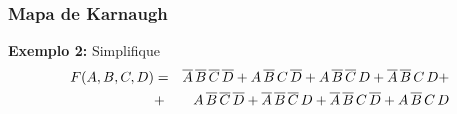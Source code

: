 \documentclass{beamer}
\begin{document}
\begin{frame}
\frametitle{Mapa de Karnaugh}

\textbf{Exemplo 2: } Simplifique
\begin{eqnarray*}
F(A,B,C,D) & = & \overline{A} \, \overline{B} \, \overline{C} \, \overline{D} +
                 A \, \overline{B} \, C \, \overline{D} +
                 A \, \overline{B} \, \overline{C} \, D +
                 \overline{A} \, \overline{B} \, C \, D +\\
           & + & A \, \overline{B} \, \overline{C} \, \overline{D} +
                 \overline{A} \, \overline{B} \, \overline{C} \, D +
                 \overline{A} \, \overline{B} \, C \, \overline{D} +
                 A \, \overline{B} \, C \, D
\end{eqnarray*}

\hspace*{\fill}%
%
%
%
\hspace*{\fill}


\end{frame}
\end{document}
